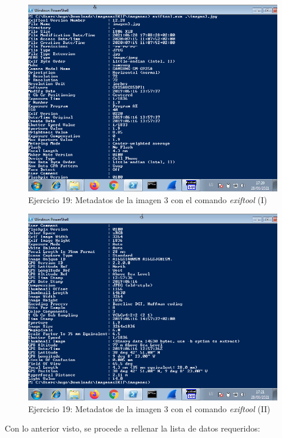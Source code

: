 \documentclass[11pt]{article}
\begin{document}
\begin{figure}[H]
    \caption{Ejercicio 19: Metadatos de la imagen 3 con el comando \textit{exiftool} (I)}
    \centering
    \includegraphics[scale=0.7]{p03/e19-7.png}
\end{figure}

\begin{figure}[H]
    \caption{Ejercicio 19: Metadatos de la imagen 3 con el comando \textit{exiftool} (II)}
    \centering
    \includegraphics[scale=0.7]{p03/e19-8.png}
\end{figure}

Con lo anterior visto, se procede a rellenar la lista de datos requeridos:
\end{document}
